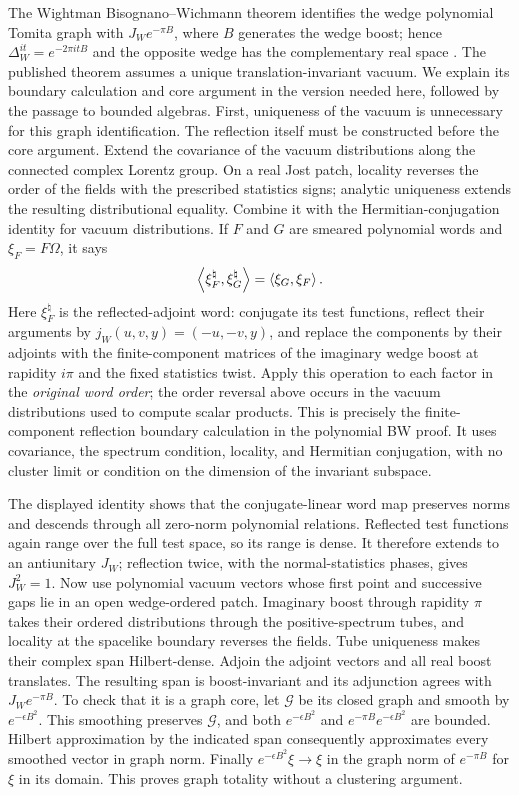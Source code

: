 The Wightman Bisognano--Wichmann theorem identifies the wedge polynomial
Tomita graph with $J_W e^{-\pi B}$, where $B$ generates the wedge boost;
hence $\Delta_W^{it}=e^{-2\pi itB}$ and the opposite wedge has the
complementary real space \cite{BW1976}. The published theorem assumes a
unique translation-invariant vacuum. We explain its boundary calculation
and core argument in the version needed here, followed by the passage
to bounded algebras. First, uniqueness of the vacuum is unnecessary for
this graph identification. The reflection itself must be constructed before the
core argument. Extend the covariance of the vacuum distributions along
the connected complex Lorentz group. On a real Jost patch, locality
reverses the order of the fields with the prescribed statistics signs;
analytic uniqueness extends the resulting distributional equality.
Combine it with the Hermitian-conjugation identity for vacuum
distributions. If $F$ and $G$ are smeared polynomial words and
$\xi_F=F\Omega$, it says
\[
 \left\langle\xi_F^{\natural},\xi_G^{\natural}\right\rangle
       =\left\langle\xi_G,\xi_F\right\rangle.
\]
Here $\xi_F^{\natural}$ is the reflected-adjoint word: conjugate its
test functions, reflect their arguments by
$j_W(u,v,y)=(-u,-v,y)$, and replace the components by their adjoints
with the finite-component matrices of the imaginary wedge boost at
rapidity $i\pi$ and the fixed statistics twist. Apply this operation
to each factor in the \emph{original word order}; the order reversal
above occurs in the vacuum distributions used to compute scalar
products. This is precisely the finite-component reflection boundary
calculation in the polynomial BW proof. It uses covariance, the spectrum
condition, locality, and Hermitian conjugation, with no cluster limit
or condition on the dimension of the invariant subspace.

The displayed identity shows that the conjugate-linear word map
preserves norms and descends through all zero-norm polynomial relations.
Reflected test functions again range over the full test space, so its
range is dense. It therefore extends to an antiunitary $J_W$;
reflection twice, with the normal-statistics phases, gives $J_W^2=1$.
Now use polynomial vacuum vectors whose first point and successive gaps
lie in an open wedge-ordered patch. Imaginary boost
through rapidity $\pi$ takes their ordered distributions through the
positive-spectrum tubes, and locality at the spacelike boundary reverses
the fields. Tube uniqueness makes their complex span Hilbert-dense.
Adjoin the adjoint vectors and all real boost translates. The resulting
span is boost-invariant and its adjunction agrees with
$J_W e^{-\pi B}$. To check that it is a graph core, let $\mathcal G$ be
its closed graph and smooth by $e^{-\epsilon B^2}$. This smoothing
preserves $\mathcal G$, and both
$e^{-\epsilon B^2}$ and $e^{-\pi B}e^{-\epsilon B^2}$ are bounded.
Hilbert approximation by the indicated span consequently approximates
every smoothed vector in graph norm. Finally
$e^{-\epsilon B^2}\xi\to\xi$ in the graph norm of $e^{-\pi B}$ for
$\xi$ in its domain. This proves graph totality without a clustering
argument.

